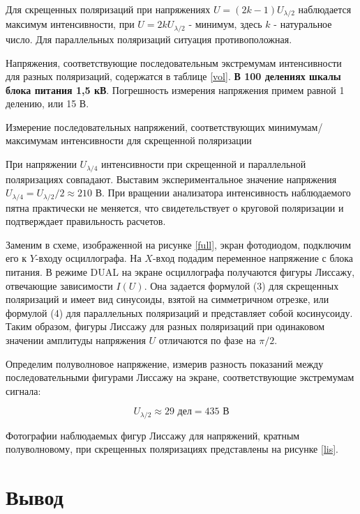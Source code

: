 \documentclass[15pt,a5paper,reqno]{article}
\begin{document}
	Для скрещенных поляризаций при напряжениях $U = (2k - 1)U_{\lambda/2}$ наблюдается максимум интенсивности, при $U = 2kU_{\lambda/2}$ - минимум, здесь $k$ - натуральное число. Для параллельных поляризаций ситуация противоположная. 
	
	Напряжения, соответствующие последовательным экстремумам интенсивности для разных поляризаций, содержатся в таблице \ref{vol}.\textbf{	В 100 делениях шкалы блока питания 1,5 кВ}. Погрешность измерения напряжения примем равной 1 делению, или 15 В. 
	
	\begin{table}[h]
		\centering
		
		\caption{Измерение последовательных напряжений, соответствующих минимумам/максимумам интенсивности для скрещенной поляризации}
		\label{vol}
	\end{table}	
	
	При напряжении $U_{\lambda/4}$ интенсивности при скрещенной и параллельной поляризациях совпадают. Выставим экспериментальное значение напряжения $U_{\lambda/4} = U_{\lambda/2}/2 \approx 210$ В. При вращении анализатора интенсивность наблюдаемого пятна практически не меняется, что свидетельствует о круговой поляризации и подтверждает правильность расчетов.  
	
	Заменим в схеме, изображенной на рисунке \ref{full}, экран фотодиодом, подключим его к $Y$-входу осциллографа. На $X$-вход подадим переменное напряжение с блока питания. В режиме DUAL на экране осциллографа получаются фигуры Лиссажу, отвечающие зависимости $I(U)$. Она задается формулой (3) для скрещенных поляризаций и имеет вид синусоиды, взятой на симметричном отрезке, или формулой (4) для параллельных поляризаций и представляет собой косинусоиду. Таким образом, фигуры Лиссажу для разных поляризаций при одинаковом значении амплитуды напряжения $U$ отличаются по фазе на $\pi/2$.
	
	Определим полуволновое напряжение, измерив разность показаний между последовательными фигурами Лиссажу на экране, соответствующие экстремумам сигнала: 
	
	\[ U_{\lambda/2} \approx 29 \text{ дел} = 435 \text{ В} \]
	
	Фотографии наблюдаемых фигур Лиссажу для напряжений, кратным полуволновому, при скрещенных поляризациях представлены на рисунке \ref{lis}.
	
	\section{Вывод}
	
\end{document}
